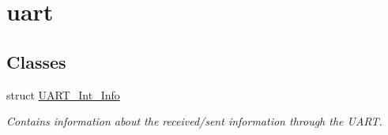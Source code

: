 \hypertarget{group__uart}{}\section{uart}
\label{group__uart}
\subsection*{Classes}
\begin{DoxyCompactItemize}
\item 
struct \mbox{\hyperlink{struct_u_a_r_t___int___info}{U\+A\+R\+T\+\_\+\+Int\+\_\+\+Info}}
\begin{DoxyCompactList}\small\item\em Contains information about the received/sent information through the U\+A\+RT. \end{DoxyCompactList}\end{DoxyCompactItemize}
